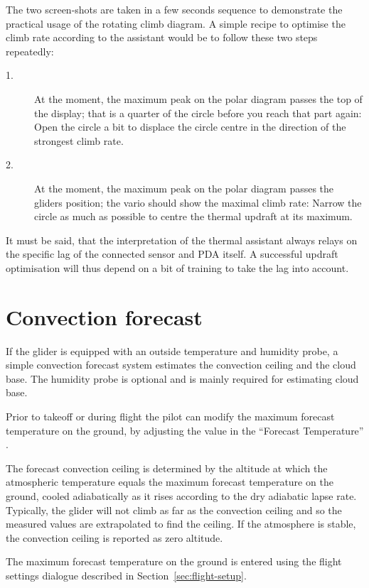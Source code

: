 The two screen-shots are taken in a few seconds sequence to demonstrate the
practical usage of the rotating climb diagram. A simple recipe to optimise
the climb rate according to the assistant would be to follow these two steps
repeatedly:
\begin{description}
\item[1.]  At the moment, the maximum peak on the polar diagram passes the top of
the display; that is a quarter of the circle before you reach that part again:
Open the circle a bit to displace the circle centre in the direction of the
strongest climb rate.
\item[2.]  At the moment, the maximum peak on the polar diagram passes the
gliders position; the vario should show the maximal climb rate: Narrow the
circle as much as possible to centre the thermal updraft at its maximum. 
\end{description}

It must be said, that the interpretation of the thermal assistant always relays
on the specific lag of the connected sensor and PDA itself. A successful
updraft optimisation will thus depend on a bit of training to take the lag into account.


\section{Convection forecast}\label{sec:convection-forecast}

If the glider is equipped with an outside temperature and humidity
probe, a simple convection forecast system estimates the convection
ceiling and the cloud base.  The humidity probe is optional and is
mainly required for estimating cloud base.

Prior to takeoff or during flight the pilot can modify the maximum
forecast temperature on the ground, by adjusting the value in the
``Forecast Temperature'' {\InfoBox}.

The forecast convection ceiling is determined by the altitude at which
the atmospheric temperature equals the maximum forecast temperature on
the ground, cooled adiabatically as it rises according to the dry
adiabatic lapse rate.  Typically, the glider will not climb as far as
the convection ceiling and so the measured values are extrapolated to
find the ceiling.  If the atmosphere is stable, the convection ceiling
is reported as zero altitude.

The maximum forecast temperature on the ground is entered using the
flight settings dialogue described in Section~\ref{sec:flight-setup}.



